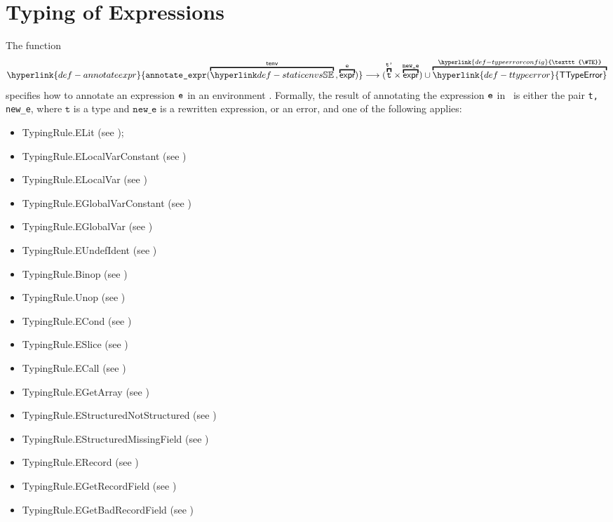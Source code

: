 \documentclass{book}
\newcommand\TTypeError[0]{\hyperlink{def-ttypeerror}{\textsf{TTypeError}}}
\newcommand\TypeErrorConfig[0]{\hyperlink{def-typeerrorconfig}{\texttt{\#TE}}}
\newcommand\annotateexpr[1]{\hyperlink{def-annotateexpr}{\texttt{annotate\_expr}(#1)}}
\newcommand\vt[0]{\texttt{t}}
\newcommand\newe[0]{\texttt{new\_e}}
\newcommand\vtp[0]{\texttt{t'}}
\begin{document}
\chapter{Typing of Expressions}
\hypertarget{def-annotateexpr}{}
The function
\[
  \annotateexpr{\overname{\staticenvs}{\tenv} \aslsep \overname{\expr}{\ve}}
  \aslto (\overname{\vt}{\vtp} \times \overname{\expr}{\newe})
  \cup \overname{\TTypeError}{\TypeErrorConfig}
\]
specifies how to annotate an expression $\texttt{e}$ in
an environment \tenv.  Formally, the result of annotating the expression
$\texttt{e}$ in \tenv\ is either the pair \texttt{t, new\_e}, where $\vt$ is a type and
$\newe$ is a rewritten expression, or an error, and one of the following applies:
\begin{itemize}
\item TypingRule.ELit (see );
\item TypingRule.ELocalVarConstant (see )
\item TypingRule.ELocalVar (see )
\item TypingRule.EGlobalVarConstant (see )
\item TypingRule.EGlobalVar (see )
\item TypingRule.EUndefIdent (see )
\item TypingRule.Binop (see )
\item TypingRule.Unop (see )
\item TypingRule.ECond (see )
\item TypingRule.ESlice (see )
\item TypingRule.ECall (see )
\item TypingRule.EGetArray (see )
\item TypingRule.EStructuredNotStructured (see )
\item TypingRule.EStructuredMissingField (see )
\item TypingRule.ERecord (see )
\item TypingRule.EGetRecordField (see )
\item TypingRule.EGetBadRecordField (see )

\end{itemize}
\end{document}
